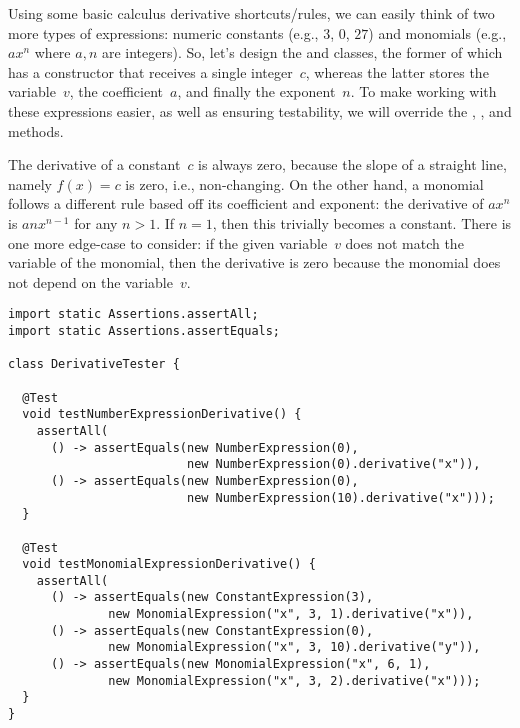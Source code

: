 Using some basic calculus derivative shortcuts/rules, we can easily think of two more types of expressions: numeric constants (e.g., $3$, $0$, $27$) and monomials (e.g., $ax^n$ where $a, n$ are integers). 
So, let's design the  and  classes, the former of which has a constructor that receives a single integer~$c$, whereas the latter stores the variable~$v$, the coefficient~$a$, and finally the exponent~$n$. 
To make working with these expressions easier, as well as ensuring testability, we will override the , , and  methods.

The derivative of a constant~$c$ is always zero, because the slope of a straight line, namely $f(x) = c$ is zero, i.e., non-changing. 
On the other hand, a monomial follows a different rule based off its coefficient and exponent: the derivative of $ax^n$ is $anx^{n-1}$ for any $n > 1$. 
If $n=1$, then this trivially becomes a constant. 
There is one more edge-case to consider: if the given variable~$v$ does not match the variable of the monomial, then the derivative is zero because the monomial does not depend on the variable~$v$.

\enlargethispage{3\baselineskip}
\begin{lstlisting}[language=MyJava]
import static Assertions.assertAll;
import static Assertions.assertEquals;

class DerivativeTester {

  @Test
  void testNumberExpressionDerivative() {
    assertAll(
      () -> assertEquals(new NumberExpression(0),
                         new NumberExpression(0).derivative("x")),
      () -> assertEquals(new NumberExpression(0),
                         new NumberExpression(10).derivative("x")));
  }

  @Test
  void testMonomialExpressionDerivative() {
    assertAll(
      () -> assertEquals(new ConstantExpression(3),
              new MonomialExpression("x", 3, 1).derivative("x")),
      () -> assertEquals(new ConstantExpression(0),
              new MonomialExpression("x", 3, 10).derivative("y")),
      () -> assertEquals(new MonomialExpression("x", 6, 1),
              new MonomialExpression("x", 3, 2).derivative("x")));
  }
}
\end{lstlisting}

